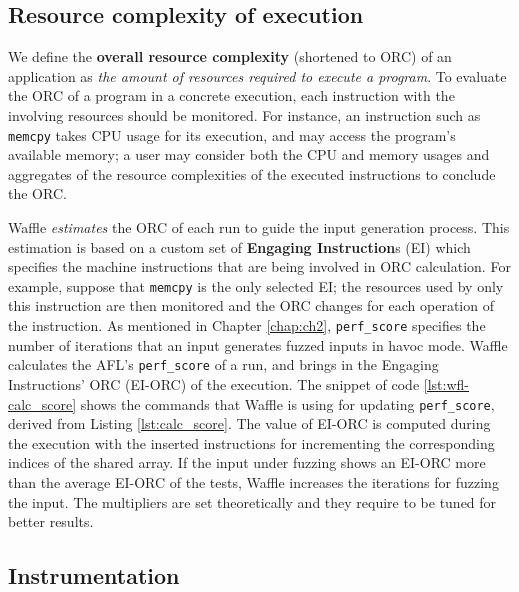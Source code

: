 \subsection{Resource complexity of execution}

We define the \textbf{overall resource complexity} (shortened to ORC) of an application as \textit{the amount of resources required to execute a program}. To evaluate the ORC of a program in a concrete execution, each instruction with the involving resources should be monitored. For instance, an instruction such as \texttt{memcpy} takes CPU usage for its execution, and may access the program's available memory; a user may consider both the CPU and memory usages and aggregates of the resource complexities of the executed instructions to conclude the ORC.


Waffle \textit{estimates} the ORC of each run to guide the input generation process. This estimation is based on a custom set of \textbf{Engaging Instruction}s (EI) which specifies the machine instructions that are being involved in ORC calculation. For example, suppose that \texttt{memcpy} is the only selected EI; the resources used by only this instruction are then monitored and the ORC changes for each operation of the instruction. As mentioned in Chapter \ref{chap:ch2}, \texttt{perf\_score} specifies the number of iterations that an input generates fuzzed inputs in havoc mode. Waffle calculates the AFL's \texttt{perf\_score} of a run, and brings in the Engaging Instructions' ORC (EI-ORC) of the execution. The snippet of code \ref{lst:wfl-calc_score} shows the commands that Waffle is using for updating \texttt{perf\_score}, derived from Listing \ref{lst:calc_score}. The value of EI-ORC is computed during the execution with the inserted instructions for incrementing the corresponding indices of the shared array. If the input under fuzzing shows an EI-ORC more than the average EI-ORC of the tests, Waffle increases the iterations for fuzzing the input. The multipliers are set theoretically and they require to be tuned for better results.



\subsection{Instrumentation}
\label{subsec:inst}

